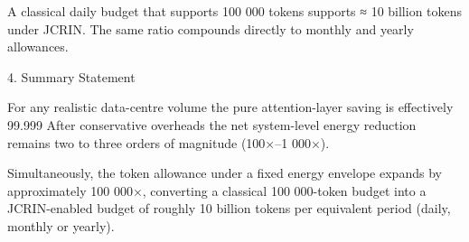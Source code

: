 A classical daily budget that supports 100 000 tokens supports ≈ 10 billion tokens under JCRIN.
The same ratio compounds directly to monthly and yearly allowances.

4. Summary Statement

For any realistic data-centre volume the pure attention-layer saving is effectively 99.999 %
After conservative overheads the net system-level energy reduction remains two to three orders of magnitude (100×–1 000×).  

Simultaneously, the token allowance under a fixed energy envelope expands by approximately 100 000×, converting a classical 100 000-token budget into a JCRIN-enabled budget of roughly 10 billion tokens per equivalent period (daily, monthly or yearly).

